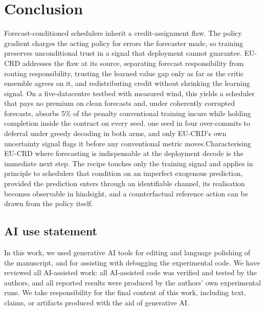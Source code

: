 \documentclass{article} %
\newif\ifFragileUnresolved \FragileUnresolvedfalse
\newcommand{\FragTag}{\ifFragileUnresolved\textcolor{red}{\,[UNRESOLVED]}\fi}
\newif\ifFragileNone   \FragileNonefalse
\newif\ifFragilePattern \FragilePatterntrue
\newcommand{\ResFragileCount}{one seed in four}
\newcommand{\ResContain}{5\%}          %
\begin{document}
\section{Conclusion}
Forecast-conditioned schedulers inherit a credit-assignment flaw. The policy gradient charges the acting policy for errors the forecaster made, so training preserves unconditional trust in a signal that deployment cannot guarantee. EU-CRD addresses the flaw at its source, separating forecast responsibility from routing responsibility, trusting the learned value gap only as far as the critic ensemble agrees on it, and redistributing credit without shrinking the learning signal. On a five-datacentre testbed with measured wind, this yields a scheduler that pays no premium on clean forecasts and, under coherently corrupted forecasts, absorbs \ResContain{} of the penalty conventional training incurs while holding completion inside the contract on every seed. \ifFragileNone\else\ifFragilePattern \ResFragileCount{}\FragTag{} over-commits to deferral under greedy decoding in both arms, and only EU-CRD's own uncertainty signal flags it before any conventional metric moves.\fi\fi Characterising EU-CRD where forecasting is indispensable at the deployment decode is the immediate next step. The recipe touches only the training signal and applies in principle to schedulers that condition on an imperfect exogenous prediction, provided the prediction enters through an identifiable channel, its realisation becomes observable in hindsight, and a counterfactual reference action can be drawn from the policy itself.

\subsection*{AI use statement}
In this work, we used generative AI tools for editing and language polishing of the manuscript, and for assisting with debugging the experimental code. We have reviewed all AI-assisted work: all AI-assisted code was verified and tested by the authors, and all reported results were produced by the authors' own experimental runs. We take responsibility for the final content of this work, including text, claims, or artifacts produced with the aid of generative AI.
\end{document}
